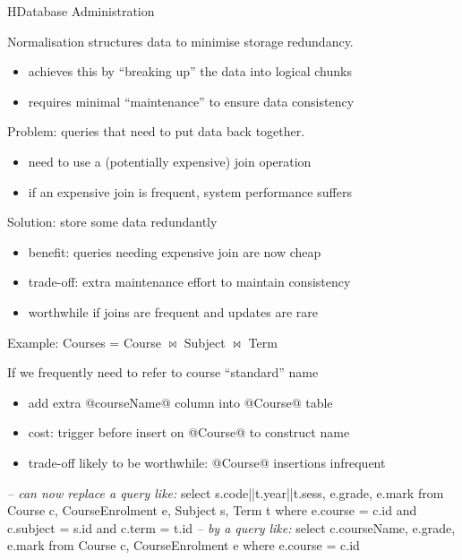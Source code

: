 \begin{lecture}{H}{Database Administration}
\begin{slide}
Normalisation structures data to minimise storage redundancy.
\begin{itemize}
\vspace{-1ex}\item achieves this by ``breaking up'' the data into logical chunks
\vspace{-1ex}\item requires minimal ``maintenance'' to ensure data consistency
\end{itemize}
Problem: queries that need to put data back together.
\begin{itemize}
\vspace{-1ex}\item need to use a (potentially expensive) join operation
\vspace{-1ex}\item if an expensive join is frequent, system performance suffers
\end{itemize}
Solution: store some data redundantly
\begin{itemize}
\vspace{-1ex}\item benefit: queries needing expensive join are now cheap
\vspace{-1ex}\item trade-off: extra maintenance effort to maintain consistency
\vspace{-1ex}\item worthwhile if joins are frequent and updates are rare
\end{itemize}
\end{slide}

\begin{slide}
Example: Courses = Course $\bowtie$ Subject $\bowtie$ Term

If we frequently need to refer to course ``standard'' name
\begin{itemize}
\item add extra @courseName@ column into @Course@ table
\item cost: trigger before insert on @Course@ to construct name
\item trade-off likely to be worthwhile: @Course@ insertions infrequent
\end{itemize}
\begin{indent}
\begin{small}
\begin{session}
    {\textit{-- can now replace a query like:}}
    select s.code||t.year||t.sess, e.grade, e.mark
    from   Course c, CourseEnrolment e, Subject s, Term t
    where  e.course = c.id and c.subject = s.id and c.term = t.id
    {\textit{-- by a query like:}}
    select c.courseName, e.grade, e.mark
    from   Course c, CourseEnrolment e
    where  e.course = c.id 
\end{session}
\end{small}
\end{indent}
\end{slide}


\end{lecture}
